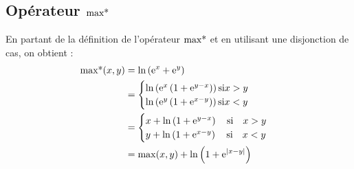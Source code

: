 \subsection{Opérateur $\operatorname*{max*}$}\label{append:maxstar}
En partant de la définition de l’opérateur $\operatorname*{max*}$ et en utilisant une disjonction de cas, on obtient : 
\begin{align*}
	\operatorname*{max*}(x,y) & = \ln\left(\mathrm{e}^x+\mathrm{e}^y\right)              \\
	              & =\begin{cases}                           
	\ln	\left(\mathrm{e}^x\left(1+\mathrm{e}^{y-x}\right)\right) \text{si} x>y  \\
	\ln	\left(\mathrm{e}^y\left(1+\mathrm{e}^{x-y}\right)\right) \text{si} x<y
	\end{cases}\\
	              & =\begin{cases}                           
	x + \ln\left(1+\mathrm{e}^{y-x}\right) \quad\text{si}\quad x>y  \\
	y+\ln\left(1+\mathrm{e}^{x-y}\right) \quad\text{si}\quad x<y
	\end{cases}\\
	              & =\max(x,y) +\ln\left(1+\mathrm{e}^{|x-y|}\right) 
\end{align*}






